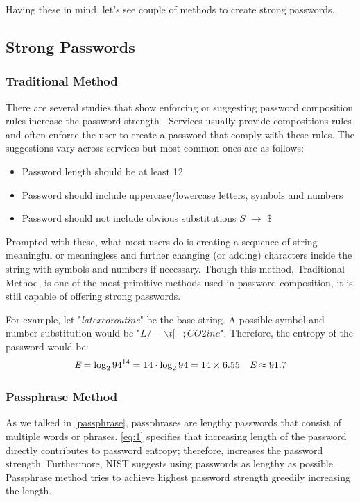 \documentclass[acmsmall,nonacm]{acmart}
\begin{document}
Having these in mind, let's see couple of methods to create strong passwords.

\subsection{Strong Passwords} \label{strong}

\subsubsection{Traditional Method} \label{creation-traditional}

There are several studies that show enforcing or suggesting password composition rules increase the password strength \cite{shay_2010, shay_2015}. Services usually provide compositions rules and often enforce the user to create a password that comply with these rules. The suggestions vary across services but most common ones are as follows:

\begin{itemize}
\item Password length should be at least 12
\item Password should include uppercase/lowercase letters, symbols and numbers
\item Password should not include obvious substitutions $S$ ${\displaystyle \rightarrow }$ $\$$
\end{itemize}

Prompted with these, what most users do is creating a sequence of string meaningful or meaningless and further changing (or adding) characters inside the string with symbols and numbers if necessary. Though this method, Traditional Method, is one of the most primitive methods used in password composition, it is still capable of offering strong passwords.

For example, let "\emph{latexcoroutine}" be the base string. A possible symbol and number substitution would be "$L/-\backslash t[-;CO2ine$". Therefore, the entropy of the password would be:
\begin{align*}
    \emph{E} = \log_2 94^{14} &= 14 \cdot \log_2 94 = 14 \times 6.55 &\emph{E} \approx 91.7
\end{align*}

\subsubsection{Passphrase Method} \label{creation-passphrase}

As we talked in \autoref{passphrase}, passphrases are lengthy passwords that consist of multiple words or phrases. \autoref{eq:1} specifies that increasing length of the password directly contributes to password entropy; therefore, increases the password strength. Furthermore, NIST suggests using passwords as lengthy as possible. Passphrase method tries to achieve highest password strength greedily increasing the length.
\end{document}
